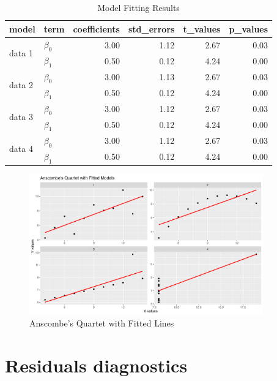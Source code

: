 \documentclass[12pt]{article}
\begin{document}
\begin{table}
    \centering
    \begin{tabular}{llrrrr}
      \hline
    model & term & coefficients & std\_errors & t\_values & p\_values \\ 
      \hline
    \multirow{2}{*}{data 1} & $\beta_0$ & 3.00 & 1.12 & 2.67 & 0.03 \\ 
      & $\beta_1$ & 0.50 & 0.12 & 4.24 & 0.00 \\ 
      \hline
    \multirow{2}{*}{data 2} & $\beta_0$ & 3.00 & 1.13 & 2.67 & 0.03 \\ 
      & $\beta_1$ & 0.50 & 0.12 & 4.24 & 0.00 \\ 
      \hline
    \multirow{2}{*}{data 3} & $\beta_0$ & 3.00 & 1.12 & 2.67 & 0.03 \\ 
      & $\beta_1$ & 0.50 & 0.12 & 4.24 & 0.00 \\ 
      \hline
    \multirow{2}{*}{data 4} & $\beta_0$ & 3.00 & 1.12 & 2.67 & 0.03 \\ 
      & $\beta_1$ & 0.50 & 0.12 & 4.24 & 0.00 \\ 
       \hline
    \end{tabular}
    \caption{Model Fitting Results} 
    \label{tab:model_fitting_results}
\end{table}

\begin{figure}[!h]
    \centering
    \includegraphics[width=0.9\textwidth]{../results/anscombe_quartet_fitted.png}
    \caption{Anscombe's Quartet with Fitted Lines}
    \label{fig:anscombe_quartet_fitted}
\end{figure}

\section{Residuals diagnostics}
\end{document}
